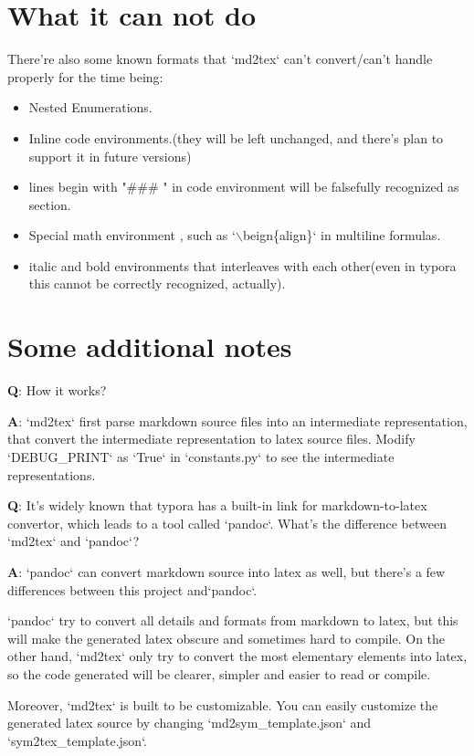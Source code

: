 \documentclass[UTF8]{ctexart}
\begin{document}
\section{What it can not do}

There're also some known formats that `md2tex` can't convert/can't handle properly for the time being:

\begin{itemize}	\item Nested Enumerations.
	\item Inline code environments.(they will be left unchanged, and there's plan to support it in future versions)
	\item lines begin with "\#\#\# " in code environment will be falsefully recognized as section.
	\item Special math environment , such as `$\backslash$beign\{align\}` in multiline formulas.
	\item italic and bold environments that interleaves with each other(even in typora this cannot be correctly recognized, actually).
\end{itemize}
\section{Some additional notes}

\textbf{Q}: How it works?

\textbf{A}: `md2tex` first parse markdown source files into an intermediate representation, that convert the intermediate representation to latex source files. Modify `DEBUG\_PRINT` as `True` in `constants.py` to see the intermediate representations.

\textbf{Q}: It's widely known that typora has a built-in link for markdown-to-latex convertor, which leads to a tool called `pandoc`. What's the difference between `md2tex` and `pandoc`?

\textbf{A}:  `pandoc` can convert markdown source into latex as well, but there's a few differences between this project and`pandoc`.

`pandoc` try to convert all details and formats from markdown to latex, but this will make the generated latex obscure and sometimes hard to compile. On the other hand, `md2tex` only try to convert the most elementary elements into latex, so the code generated will be clearer, simpler and easier to read or compile. 

Moreover, `md2tex` is built to be customizable. You can easily customize the generated latex source by changing `md2sym\_template.json` and `sym2tex\_template.json`.
\end{document}
